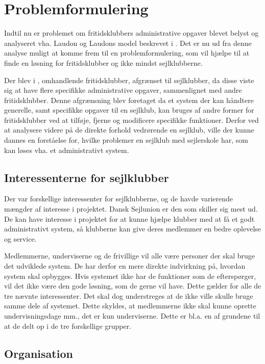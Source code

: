 \chapter{Problemformulering}\label{chap:problemformulering-new}

Indtil nu er problemet om fritidsklubbers administrative opgaver blevet belyst og analyseret vha. Laudon og
Laudons model beskrevet i . Det er nu ud fra denne analyse muligt at
komme frem til en problemformulering, som vil hjælpe til at finde en løsning for fritidsklubber og ikke mindst
sejlklubberne.

Der blev i , omhandlende fritidsklubber, afgrænset til sejlklubber, da disse viste sig
at have flere specifikke administrative opgaver, sammenlignet med andre fritidsklubber. Denne afgrænsning blev foretaget
da et system der kan håndtere generelle, samt specifikke opgaver til en sejlklub, kan bruges af andre former for
fritidsklubber ved at tilføje, fjerne og modificere specifikke funktioner. Derfor ved at analysere videre på de
direkte forhold vedrørende en sejlklub, ville der kunne dannes en forståelse for, hvilke problemer en sejlklub
med sejlerskole har, som kan løses vha. et administrativt system.


\section{Interessenterne for sejlklubber}

Der var forskellige interessenter for sejlklubberne, og de havde varierende mængder af interesse i projektet.
Dansk Sejlunion er den som skiller sig mest ud. De kan have interesse i projektet for at kunne hjælpe klubber
med at få et godt administrativt system, så klubberne kan give deres medlemmer en bedre oplevelse og service.

Medlemmerne, underviserne og de frivillige vil alle være personer der skal bruge det udviklede system. De har
derfor en mere direkte indvirkning på, hvordan system skal opbygges. Hvis systemet ikke har de funktioner som
de efterspørger, vil det ikke være den gode løsning, som de gerne vil have. Dette gælder for alle de tre
nævnte interessenter. Det skal dog understreges at de ikke ville skulle bruge samme dele af systemet. Dette
skyldes, at medlemmerne ikke skal kunne oprette undervisningsdage mm., det er kun underviserne. Dette er bl.a.
en af grundene til at de delt op i de tre forskellige grupper.


\section{Organisation}


